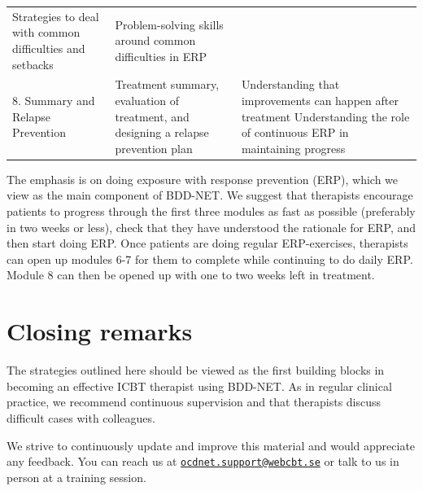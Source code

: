 \documentclass[]{book}
\begin{document}
\begin{longtable}[]{@{}lll@{}}
\begin{minipage}[t]{0.33\columnwidth}
Strategies to deal with common difficulties and setbacks\strut
\end{minipage} & \begin{minipage}[t]{0.25\columnwidth}\raggedright
Problem-solving skills around common difficulties in ERP\strut
\end{minipage}\tabularnewline
\begin{minipage}[t]{0.33\columnwidth}\raggedright
8. Summary and Relapse Prevention\strut
\end{minipage} & \begin{minipage}[t]{0.33\columnwidth}\raggedright
Treatment summary, evaluation of treatment, and designing a relapse prevention plan\strut
\end{minipage} & \begin{minipage}[t]{0.25\columnwidth}\raggedright
Understanding that improvements can happen after treatment Understanding the role of continuous ERP in maintaining progress\strut
\end{minipage}\tabularnewline
\bottomrule
\end{longtable}

The emphasis is on doing exposure with response prevention (ERP), which we view as the main component of BDD-NET. We suggest that therapists encourage patients to progress through the first three modules as fast as possible (preferably in two weeks or less), check that they have understood the rationale for ERP, and then start doing ERP. Once patients are doing regular ERP-exercises, therapists can open up modules 6-7 for them to complete while continuing to do daily ERP. Module 8 can then be opened up with one to two weeks left in treatment.

\hypertarget{closing-remarks-1}{%
\section{Closing remarks}\label{closing-remarks-1}}

The strategies outlined here should be viewed as the first building blocks in becoming an effective ICBT therapist using BDD-NET. As in regular clinical practice, we recommend continuous supervision and that therapists discuss difficult cases with colleagues.

We strive to continuously update and improve this material and would appreciate any feedback. You can reach us at \href{mailto:ocdnet.support@webcbt.se}{\nolinkurl{ocdnet.support@webcbt.se}} or talk to us in person at a training session.
\end{document}
